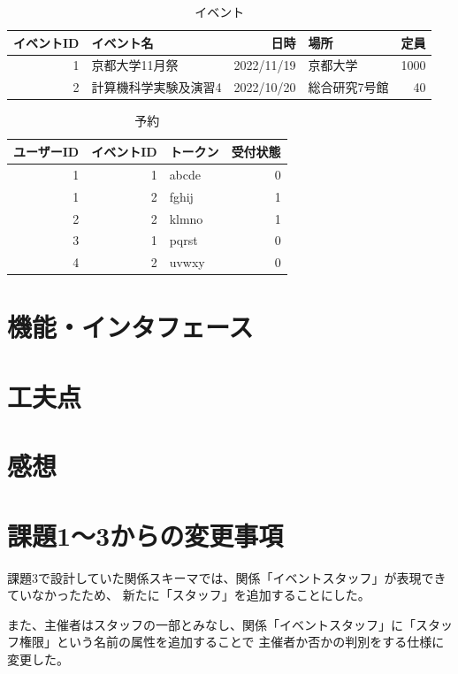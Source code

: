\documentclass[dvipdfmx]{jarticle}
\begin{document}
\begin{table}[H]
  \centering
   \begin{tabular}{|r|l|r|l|r|}
    \hline
    イベントID & イベント名 & 日時 & 場所 & 定員 \\
    \hline \hline
    1 & 京都大学11月祭 & 2022/11/19 & 京都大学 & 1000 \\
    2 & 計算機科学実験及演習4 & 2022/10/20 & 総合研究7号館 & 40 \\
    \hline
  \end{tabular}
  \caption{イベント}
\end{table}

\begin{table}[H]
  \centering
   \begin{tabular}{|r|r|l|r|}
    \hline
    ユーザーID & イベントID & トークン & 受付状態 \\
    \hline \hline
    1 & 1 & abcde & 0 \\
    1 & 2 & fghij & 1 \\
    2 & 2 & klmno & 1 \\
    3 & 1 & pqrst & 0 \\
    4 & 2 & uvwxy & 0 \\
    \hline
  \end{tabular}
  \caption{予約}
\end{table}


\section{機能・インタフェース}

\section{工夫点}

\section{感想}

\section{課題1〜3からの変更事項}
課題3で設計していた関係スキーマでは、関係「イベントスタッフ」が表現できていなかったため、
新たに「スタッフ」を追加することにした。

また、主催者はスタッフの一部とみなし、関係「イベントスタッフ」に「スタッフ権限」という名前の属性を追加することで
主催者か否かの判別をする仕様に変更した。
\end{document}
